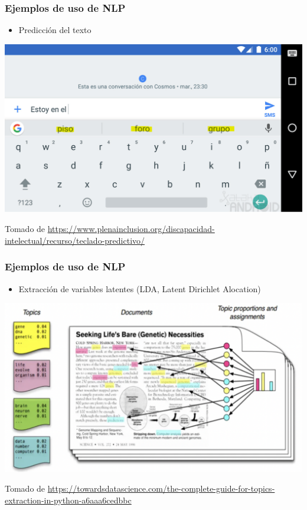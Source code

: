 \documentclass[
10pt, %
aspectratio=169, %
]{beamer}
\begin{document}
	
	\begin{frame}[fragile]
		
		\frametitle{Ejemplos de uso de NLP}
		
		\begin{itemize}
			\item Predicción del texto
		\end{itemize}		
		
		\centering
		\includegraphics[scale=0.4]{teclado-predictivo-xataka-android.png}
		
		{\scriptsize Tomado de \url{https://www.plenainclusion.org/discapacidad-intelectual/recurso/teclado-predictivo/}}
		
	\end{frame}
	
	
	\begin{frame}
		
		\frametitle{Ejemplos de uso de NLP}
		
		\begin{itemize}
			\item Extracción de variables latentes (LDA, Latent Dirichlet Alocation)
		\end{itemize}		
		
		\centering
		\includegraphics[scale=0.4]{lda.png}
		
		{\scriptsize Tomado de \url{https://towardsdatascience.com/the-complete-guide-for-topics-extraction-in-python-a6aaa6cedbbc}}
		
	\end{frame}
	
\end{document}
